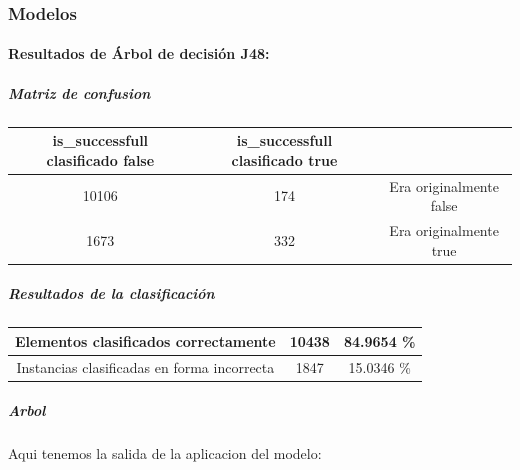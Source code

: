     \subsubsection{Modelos}

        \paragraph{Resultados de Árbol de decisión J48:}
            \subparagraph{Matriz de confusion}

                \begin{center}
                  \begin{tabular}{||c | c | c||}
                    \hline
                    is\_successfull clasificado false & is\_successfull clasificado true & \\ [0.5ex]
                    \hline
                    10106 & 174 & Era originalmente false \\
                    \hline
                    1673 & 332 & Era originalmente true \\
                    \hline
                  \end{tabular}
                \end{center}

            \subparagraph{Resultados de la clasificación}

                \begin{center}
                  \begin{tabular}{||c | c | c||}
                    \hline
                    Elementos clasificados correctamente & 10438 & 84.9654 \% \\ [0.5ex]
                    \hline
                    Instancias clasificadas en forma incorrecta & 1847 & 15.0346 \% \\
                    \hline
                  \end{tabular}
                \end{center}

            \newpage
            \subparagraph{Arbol}
            Aqui tenemos la salida de la aplicacion del modelo:

